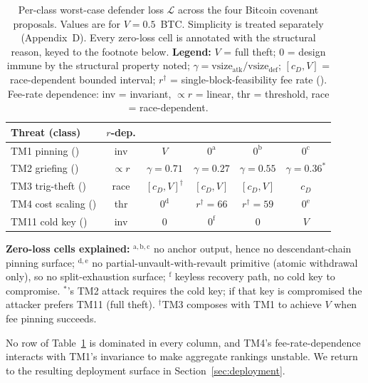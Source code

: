 \begin{table}[t]
\centering
\caption{Per-class worst-case defender loss $\mathcal{L}$ across
the four Bitcoin covenant proposals. Values are for
$V = 0.5$~BTC. Simplicity is treated separately (Appendix~D).
Every zero-loss cell is annotated with the structural reason,
keyed to the footnote below.
\textbf{Legend:} $V$ = full theft; $0$ = design immune by the
structural property noted;
$\gamma = \text{vsize}_{\text{atk}} / \text{vsize}_{\text{def}}$;
$[c_D, V]$ = race-dependent bounded interval;
$r^\dagger$ = single-block-feasibility fee rate (\satvB{}).
Fee-rate dependence: inv = invariant, $\propto r$ = linear,
thr = threshold, race = race-dependent.}
\label{tab:pareto-matrix}
\renewcommand{\arraystretch}{1.1}
\begin{tabular}{@{}lccccc@{}}
\toprule
Threat (class)                                     & $r$-dep.    & \opctv{}                    & \opccv{}                  & \opvault{}       & \catcsfs{}               \\
\midrule
TM1 pinning (\classfee{})                          & inv         & $V$                    & $0^{\mathrm{a}}$     & $0^{\mathrm{b}}$ & $0^{\mathrm{c}}$       \\
TM2 griefing (\classgrief{})                       & $\propto r$ & $\gamma{=}0.71$        & $\gamma{=}0.27$      & $\gamma{=}0.55$  & $\gamma{=}0.36^{*}$    \\
TM3 trig-theft (\classhot{})                       & race        & $[c_D, V]^{\dagger}$   & $[c_D, V]$           & $[c_D, V]$       & $c_D$                  \\
TM4 cost scaling (\classscale{})                   & thr         & $0^{\mathrm{d}}$       & $r^\dagger{=}66$     & $r^\dagger{=}59$ & $0^{\mathrm{e}}$       \\
TM11 cold key (\classcold{})                       & inv         & $0$                    & $0^{\mathrm{f}}$     & $0$              & $V$                    \\
\bottomrule
\end{tabular}
\par\vspace{3pt}
\footnotesize
\textbf{Zero-loss cells explained:}
$^{\mathrm{a,b,c}}$ no anchor output, hence no descendant-chain
pinning surface; $^{\mathrm{d,e}}$ no partial-unvault-with-revault
primitive (atomic withdrawal only), so no split-exhaustion surface;
$^{\mathrm{f}}$ keyless recovery path, no cold key to compromise.
$^{*}$\catcsfs{}'s TM2 attack requires the cold key; if that key is
compromised the attacker prefers TM11 (full theft). $^{\dagger}$TM3
composes with TM1 to achieve $V$ when fee pinning succeeds.
\end{table}

No row of Table~\ref{tab:pareto-matrix} is dominated in every
column, and TM4's fee-rate-dependence interacts with TM1's
invariance to make aggregate rankings unstable. We return to the
resulting deployment surface in Section~\ref{sec:deployment}.

